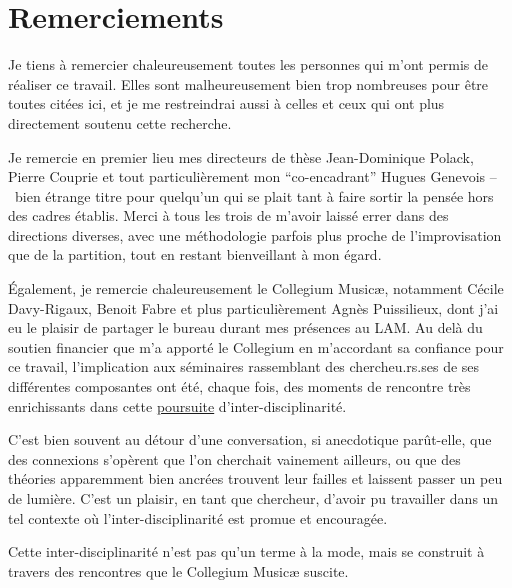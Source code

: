 %
\chapter*{Remerciements}
\label{sec:acknowledgement}
\vspace*{-10mm}




Je tiens à remercier chaleureusement toutes les personnes qui m'ont permis de réaliser ce travail. Elles sont malheureusement bien trop nombreuses pour être toutes citées ici, et je me restreindrai aussi à celles et ceux qui ont plus directement soutenu cette recherche.

Je remercie en premier lieu mes directeurs de thèse Jean-Dominique Polack, Pierre Couprie et tout particulièrement mon ``co-encadrant'' Hugues Genevois --~bien étrange titre pour quelqu'un qui se plait tant à faire sortir la pensée hors des cadres établis. Merci à tous les trois de m'avoir laissé errer dans des directions diverses, avec une méthodologie parfois plus proche de l'improvisation que de la partition, tout en restant bienveillant à mon égard.


Également, je remercie chaleureusement le Collegium Musicæ, notamment Cécile Davy-Rigaux, Benoit Fabre et plus particulièrement Agnès Puissilieux, dont j'ai eu le plaisir de partager le bureau durant mes présences au LAM. Au delà du soutien financier que m'a apporté le Collegium en m'accordant sa confiance pour ce travail, l'implication aux séminaires rassemblant des chercheu.rs.ses de ses différentes composantes ont été, chaque fois, des moments de rencontre très enrichissants dans cette \ul{poursuite} d'inter-disciplinarité. 

C'est bien souvent au détour d'une conversation, si anecdotique parût-elle, que des connexions s'opèrent que l'on cherchait vainement ailleurs, ou que des théories apparemment bien ancrées trouvent leur failles et laissent passer un peu de lumière. C'est un plaisir, en tant que chercheur, d'avoir pu travailler dans un tel contexte où l'inter-disciplinarité est promue et encouragée.

Cette inter-disciplinarité n'est pas qu'un terme à la mode, mais se construit à travers des rencontres que le Collegium Musicæ suscite.

